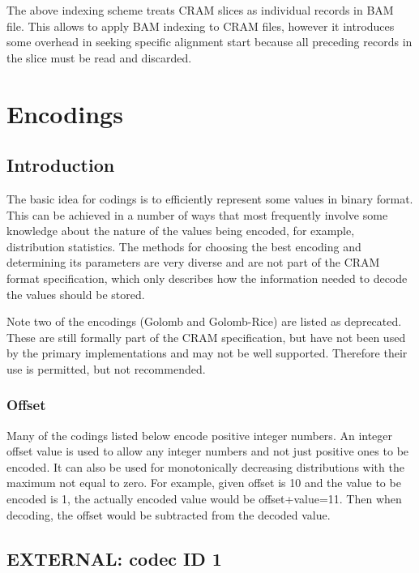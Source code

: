 \documentclass[a4paper]{article}
\begin{document}
The above indexing scheme treats CRAM slices as individual records in BAM file. 
This allows to apply BAM indexing to CRAM files, however it introduces some overhead 
in seeking specific alignment start because all preceding records in the slice 
must be read and discarded.

\section{\textbf{Encodings}}
\label{sec:encodings}


\subsection{\textbf{Introduction}}

The basic idea for codings is to efficiently represent some values in binary format. 
This can be achieved in a number of ways that most frequently involve some knowledge 
about the nature of the values being encoded, for example, distribution statistics. 
The methods for choosing the best encoding and determining its parameters are very 
diverse and are not part of the CRAM format specification, which only describes 
how the information needed to decode the values should be stored.

Note two of the encodings (Golomb and Golomb-Rice) are listed as deprecated.
These are still formally part of the CRAM specification, but have not been used by the primary implementations and may not be well supported.
Therefore their use is permitted, but not recommended.

\subsubsection*{Offset}

Many of the codings listed below encode positive integer numbers. An integer offset 
value is used to allow any integer numbers and not just positive ones to be encoded. 
It can also be used for monotonically decreasing distributions with the maximum 
not equal to zero. For example, given offset is 10 and the value to be encoded 
is 1, the actually encoded value would be offset+value=11. Then when decoding, 
the offset would be subtracted from the decoded value. 

\subsection{EXTERNAL: codec ID 1}
\end{document}
